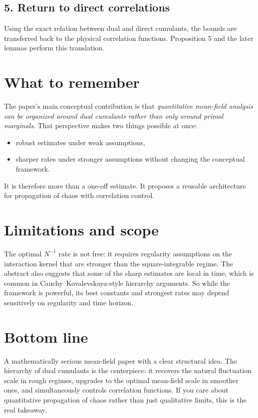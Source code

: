 \documentclass[11pt]{article}
\begin{document}
\subsection*{5. Return to direct correlations}
Using the exact relation between dual and direct cumulants, the bounds are transferred back to the physical correlation functions. Proposition 5 and the later lemmas perform this translation.
\section*{What to remember}
The paper's main conceptual contribution is that \emph{quantitative mean-field analysis can be organized around dual cumulants rather than only around primal marginals}. That perspective makes two things possible at once:
\begin{itemize}[leftmargin=1.5em]
\item robust estimates under weak assumptions,
\item sharper rates under stronger assumptions without changing the conceptual framework.
\end{itemize}
It is therefore more than a one-off estimate. It proposes a reusable architecture for propagation of chaos with correlation control.
\section*{Limitations and scope}
The optimal $N^{-1}$ rate is not free: it requires regularity assumptions on the interaction kernel that are stronger than the square-integrable regime. The abstract also suggests that some of the sharp estimates are local in time, which is common in Cauchy--Kovalevskaya-style hierarchy arguments. So while the framework is powerful, its best constants and strongest rates may depend sensitively on regularity and time horizon.
\section*{Bottom line}
A mathematically serious mean-field paper with a clear structural idea. The hierarchy of dual cumulants is the centerpiece: it recovers the natural fluctuation scale in rough regimes, upgrades to the optimal mean-field scale in smoother ones, and simultaneously controls correlation functions. If you care about quantitative propagation of chaos rather than just qualitative limits, this is the real takeaway.
\end{document}
